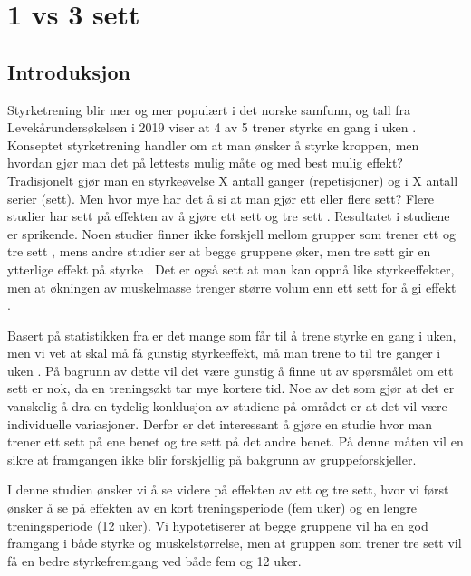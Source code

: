 \documentclass[
]{book}
\begin{document}
\hypertarget{vs-3-sett}{%
\chapter{1 vs 3 sett}\label{vs-3-sett}}

\hypertarget{introduksjon-2}{%
\section{Introduksjon}\label{introduksjon-2}}

Styrketrening blir mer og mer populært i det norske samfunn, og tall fra Levekårundersøkelsen i 2019 viser at 4 av 5 trener styrke en gang i uken \citep{statistisksentralbyrå2019}. Konseptet styrketrening handler om at man ønsker å styrke kroppen, men hvordan gjør man det på lettests mulig måte og med best mulig effekt? Tradisjonelt gjør man en styrkeøvelse X antall ganger (repetisjoner) og i X antall serier (sett). Men hvor mye har det å si at man gjør ett eller flere sett? Flere studier har sett på effekten av å gjøre ett sett og tre sett \citep{galvão2005, hass2000, krieger2009, radaelli2014, schoenfeld2019}. Resultatet i studiene er sprikende. Noen studier finner ikke forskjell mellom grupper som trener ett og tre sett \citetext{\citealp[ ]{hass2000}; \citealp{radaelli2014}}, mens andre studier ser at begge gruppene øker, men tre sett gir en ytterlige effekt på styrke \citep{krieger2009, galvão2005}. Det er også sett at man kan oppnå like styrkeeffekter, men at økningen av muskelmasse trenger større volum enn ett sett for å gi effekt \citep{schoenfeld2019}.

Basert på statistikken fra \citet{statistisksentralbyrå2019} er det mange som får til å trene styrke en gang i uken, men vi vet at skal må få gunstig styrkeeffekt, må man trene to til tre ganger i uken \citep{schoenfeld2016}. På bagrunn av dette vil det være gunstig å finne ut av spørsmålet om ett sett er nok, da en treningsøkt tar mye kortere tid. Noe av det som gjør at det er vanskelig å dra en tydelig konklusjon av studiene på området er at det vil være individuelle variasjoner. Derfor er det interessant å gjøre en studie hvor man trener ett sett på ene benet og tre sett på det andre benet. På denne måten vil en sikre at framgangen ikke blir forskjellig på bakgrunn av gruppeforskjeller.

I denne studien ønsker vi å se videre på effekten av ett og tre sett, hvor vi først ønsker å se på effekten av en kort treningsperiode (fem uker) og en lengre treningsperiode (12 uker). Vi hypotetiserer at begge gruppene vil ha en god framgang i både styrke og muskelstørrelse, men at gruppen som trener tre sett vil få en bedre styrkefremgang ved både fem og 12 uker.
\end{document}
